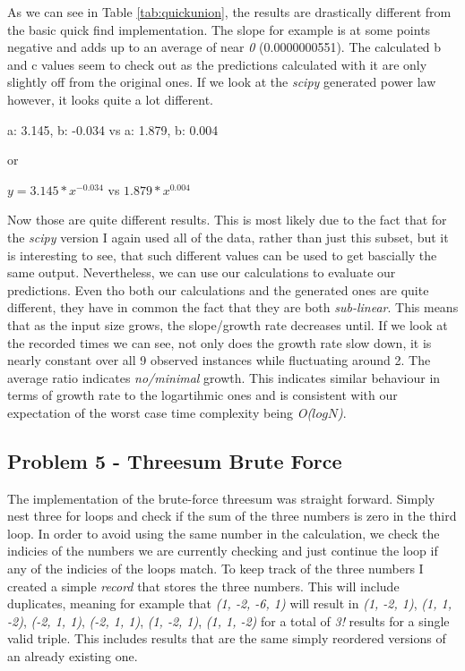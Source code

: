 \documentclass[12pt]{article}
\begin{document}
As we can see in Table \ref{tab:quickunion}, the results are drastically different from the basic quick find implementation.
The slope for example is at some points negative and adds up to an average of near \emph{0} (0.0000000551). The calculated b and c
values seem to check out as the predictions calculated with it are only slightly off from the original ones. If we look at the \emph{scipy} generated
power law however, it looks quite a lot different.

    a: 3.145, b: -0.034 vs a: 1.879, b: 0.004

    or

    $y = 3.145 * x^{-0.034}$ vs $1.879 * x^{0.004}$

Now those are quite different results. This is most likely due to the fact that for the \emph{scipy} 
version I again used all of the data, rather than just this subset, but it is interesting to see, that
such different values can be used to get bascially the same output. Nevertheless, we can use our calculations to 
evaluate our predictions. Even tho both our calculations and the generated ones are quite different, they
have in common the fact that they are both \emph{sub-linear}. This means that as the input size grows,
the slope/growth rate decreases until. If we look at the recorded times we can see, not only does the growth
rate slow down, it is nearly constant over all 9 observed instances while fluctuating around 2. 
The average ratio indicates \emph{no/minimal} growth. This indicates similar behaviour in terms of growth rate to the logartihmic ones
and is consistent with our expectation of the worst case time complexity being \emph{O($log N$)}.

\hypertarget{p5}{\subsection{Problem 5 - Threesum Brute Force}}

The implementation of the brute-force threesum was straight forward. Simply nest three for
loops and check if the sum of the three numbers is zero in the third loop. In order to avoid
using the same number in the calculation, we check the indicies of the numbers we are currently checking
 and just continue the loop if any of the indicies of the loops match. To keep track of the three numbers
I created a simple \emph{record} that stores the three numbers. This will include duplicates,
meaning for example that \emph{(1, -2, -6, 1)} will result in 
\emph{(1, -2, 1)}, \emph{(1, 1, -2)}, \emph{(-2, 1, 1)}, \emph{(-2, 1, 1)}, \emph{(1, -2, 1)}, \emph{(1, 1, -2)}
for a total of \emph{3!} results for a single valid triple. This includes results that are the same simply reordered versions
of an already existing one. 
\end{document}
